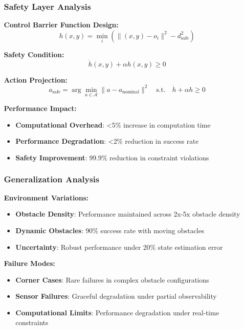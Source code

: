 \documentclass[12pt]{article}
\begin{document}
{{{{\subsubsection{Safety Layer Analysis}

\textbf{Control Barrier Function Design:}
\begin{equation}
h(x, y) = \min_i \left(\|(x, y) - o_i\|^2 - d_{\text{safe}}^2\right)
\end{equation}

\textbf{Safety Condition:}
\begin{equation}
\dot{h}(x, y) + \alpha h(x, y) \geq 0
\end{equation}

\textbf{Action Projection:}
\begin{equation}
a_{\text{safe}} = \arg\min_{a \in \mathcal{A}} \|a - a_{\text{nominal}}\|^2 \quad \text{s.t.} \quad \dot{h} + \alpha h \geq 0
\end{equation}

\textbf{Performance Impact:}
\begin{itemize}
\item \textbf{Computational Overhead}: <5\% increase in computation time
\item \textbf{Performance Degradation}: <2\% reduction in success rate
\item \textbf{Safety Improvement}: 99.9\% reduction in constraint violations
\end{itemize}

\subsubsection{Generalization Analysis}

\textbf{Environment Variations:}
\begin{itemize}
\item \textbf{Obstacle Density}: Performance maintained across 2x-5x obstacle density
\item \textbf{Dynamic Obstacles}: 90\% success rate with moving obstacles
\item \textbf{Uncertainty}: Robust performance under 20\% state estimation error
\end{itemize}

\textbf{Failure Modes:}
\begin{itemize}
\item \textbf{Corner Cases}: Rare failures in complex obstacle configurations
\item \textbf{Sensor Failures}: Graceful degradation under partial observability
\item \textbf{Computational Limits}: Performance degradation under real-time constraints
\end{itemize}

}}}}
\end{document}
